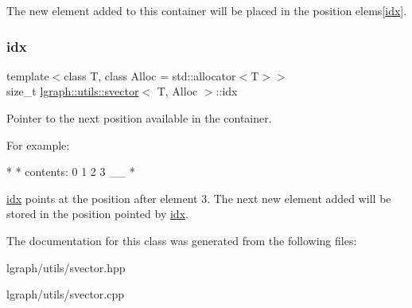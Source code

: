The new element added to this container will be placed in the position elems\mbox{[}\hyperlink{classlgraph_1_1utils_1_1svector_a7ef963c079c7dc8a6a559ceef81a241f}{idx}\mbox{]}. \mbox{\label{classlgraph_1_1utils_1_1svector_a7ef963c079c7dc8a6a559ceef81a241f}} 
\subsubsection{\texorpdfstring{idx}{idx}}
{\footnotesize\ttfamily template$<$class T, class Alloc = std\+::allocator$<$\+T$>$$>$ \\
size\+\_\+t \hyperlink{classlgraph_1_1utils_1_1svector}{lgraph\+::utils\+::svector}$<$ T, Alloc $>$\+::idx\hspace{0.3cm}{\ttfamily [private]}}



Pointer to the next position available in the container. 

For example\+: \begin{DoxyVerb}*                   \/
* contents: 0 1 2 3 __
* \end{DoxyVerb}
 \hyperlink{classlgraph_1_1utils_1_1svector_a7ef963c079c7dc8a6a559ceef81a241f}{idx} points at the position after element 3. The next new element added will be stored in the position pointed by \hyperlink{classlgraph_1_1utils_1_1svector_a7ef963c079c7dc8a6a559ceef81a241f}{idx}. 

The documentation for this class was generated from the following files\+:\begin{DoxyCompactItemize}
\item 
lgraph/utils/svector.\+hpp\item 
lgraph/utils/svector.\+cpp\end{DoxyCompactItemize}
